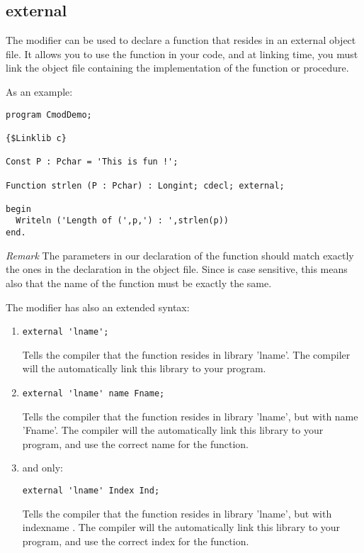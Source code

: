 \documentclass{report}
\begin{document}
\subsection{external}
\label{se:external}
The  modifier can be used to declare a function that resides in
an external object file. It allows you to use the function in
your code, and at linking time, you must link the object file containing the
implementation of the function or procedure.

As an example:
\begin{CodEx}
\begin{verbatim}
program CmodDemo;

{$Linklib c}

Const P : Pchar = 'This is fun !';

Function strlen (P : Pchar) : Longint; cdecl; external;

begin
  Writeln ('Length of (',p,') : ',strlen(p))
end.
\end{verbatim}
\end{CodEx}

{\em Remark} The parameters in our declaration of the  function 
should match exactly the ones in the declaration in the object file.
Since  is case sensitive, this means also that the name of the
function must be exactly the same.

The  modifier has also an extended syntax:
\begin{enumerate}
\item

\begin{verbatim}
external 'lname';
\end{verbatim}
Tells the compiler that the function resides in library 'lname'. The
compiler will the automatically link this library to your program.

\item
\begin{verbatim}
external 'lname' name Fname;
\end{verbatim}
Tells the compiler that the function resides in library 'lname', but with
name 'Fname'. The compiler will the automatically link this library to your 
program, and use the correct name for the function.

\item \windows and \ostwo only:
\begin{verbatim}
external 'lname' Index Ind;
\end{verbatim}
Tells the compiler that the function resides in library 'lname', but with
indexname . The compiler will the automatically link this library to your 
program, and use the correct index for the function.
\end{enumerate}
\end{document}
